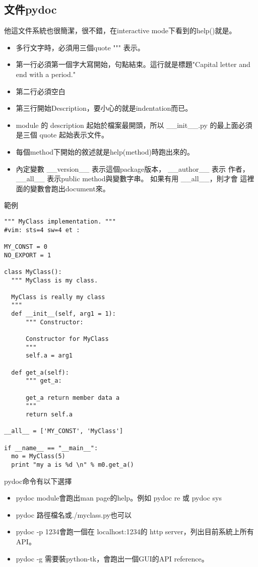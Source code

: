 \subsection{文件pydoc}
他這文件系統也很簡潔，很不錯，在interactive mode下看到的help()就是。
\begin{itemize}
\item 多行文字時，必須用三個quote """ 表示。
\item 第一行必須第一個字大寫開始，句點結束。這行就是標題"Capital letter
  and end with a period."
\item 第二行必須空白
\item 第三行開始Description，要小心的就是indentation而已。
\item module 的 description 起始於檔案最開頭，所以 \_\_init\_\_.py 
  的最上面必須是三個 quote 起始表示文件。
\item 每個method下開始的敘述就是help(method)時跑出來的。
\item 內定變數 \_\_version\_\_ 表示這個package版本， \_\_author\_\_ 表示
  作者， \_\_all\_\_ 表示public method與變數字串。 如果有用 \_\_all\_\_，則才會
  這裡面的變數會跑出document來。
\end{itemize}
範例
\begin{verbatim}
""" MyClass implementation. """
#vim: sts=4 sw=4 et :

MY_CONST = 0
NO_EXPORT = 1

class MyClass():
  """ MyClass is my class.

  MyClass is really my class
  """
  def __init__(self, arg1 = 1):
      """ Constructor:

      Constructor for MyClass
      """
      self.a = arg1

  def get_a(self):
      """ get_a:

      get_a return member data a
      """
      return self.a

__all__ = ['MY_CONST', 'MyClass']

if __name__ == "__main__":
  mo = MyClass(5)
  print "my a is %d \n" % m0.get_a()
\end{verbatim}
pydoc命令有以下選擇
\begin{itemize}
  \item pydoc module會跑出man page的help。例如 pydoc re 或 pydoc sys
  \item pydoc 路徑檔名或./myclass.py也可以
  \item pydoc -p 1234會跑一個在 localhost:1234的 http server，列出目前系統上所有API。
  \item pydoc -g 需要裝python-tk，會跑出一個GUI的API reference。
\end{itemize}

